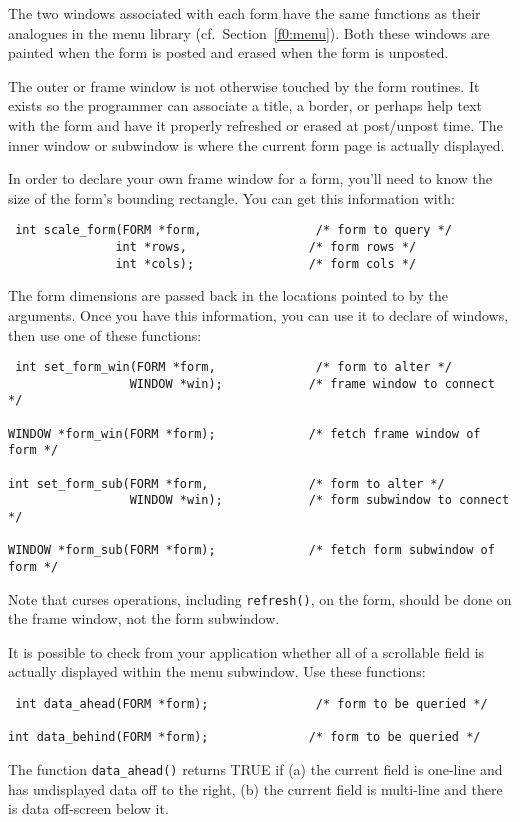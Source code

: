 The two windows associated with each form have the same functions as
their analogues in the menu library (cf.\ Section~\ref{f0:menu}).  Both these
windows are painted when the form is posted and erased when the form
is unposted. 

The outer or frame window is not otherwise touched by the form
routines.  It exists so the programmer can associate a title, a
border, or perhaps help text with the form and have it properly
refreshed or erased at post/unpost time. The inner window or subwindow
is where the current form page is actually displayed. 

In order to declare your own frame window for a form, you'll need to
know the size of the form's bounding rectangle.  You can get this
information with:
\begin{verbatim} int scale_form(FORM *form,                /* form to query */
               int *rows,                 /* form rows */
               int *cols);                /* form cols */
\end{verbatim}
The form dimensions are passed back in the locations pointed to by
the arguments.  Once you have this information, you can use it to
declare of windows, then use one of these functions:
\begin{verbatim} int set_form_win(FORM *form,              /* form to alter */
                 WINDOW *win);            /* frame window to connect */

WINDOW *form_win(FORM *form);             /* fetch frame window of form */

int set_form_sub(FORM *form,              /* form to alter */
                 WINDOW *win);            /* form subwindow to connect */

WINDOW *form_sub(FORM *form);             /* fetch form subwindow of form */
\end{verbatim}
Note that curses operations, including \texttt{refresh()}, on the form,
should be done on the frame window, not the form subwindow. 

It is possible to check from your application whether all of a
scrollable field is actually displayed within the menu subwindow.  Use
these functions:
\begin{verbatim} int data_ahead(FORM *form);               /* form to be queried */

int data_behind(FORM *form);              /* form to be queried */
\end{verbatim}
The function \texttt{data\_ahead()} returns TRUE if (a) the current
field is one-line and has undisplayed data off to the right, (b) the current
field is multi-line and there is data off-screen below it. 

